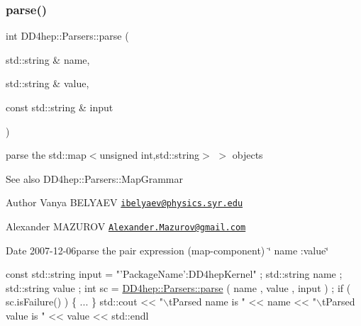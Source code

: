 \subsubsection{\texorpdfstring{parse()}{parse()}\hspace{0.1cm}{\footnotesize\ttfamily [15/21]}}
{\footnotesize\ttfamily int D\+D4hep\+::\+Parsers\+::parse (\begin{DoxyParamCaption}\item[{std\+::string \&}]{name,  }\item[{std\+::string \&}]{value,  }\item[{const std\+::string \&}]{input }\end{DoxyParamCaption})}



parse the {\ttfamily std\+::map$<$unsigned int,std\+::string$>$ $>$} objects 

\begin{DoxySeeAlso}{See also}
D\+D4hep\+::\+Parsers\+::\+Map\+Grammar 
\end{DoxySeeAlso}
\begin{DoxyAuthor}{Author}
Vanya B\+E\+L\+Y\+A\+EV \href{mailto:ibelyaev@physics.syr.edu}{\tt ibelyaev@physics.\+syr.\+edu} 

Alexander M\+A\+Z\+U\+R\+OV \href{mailto:Alexander.Mazurov@gmail.com}{\tt Alexander.\+Mazurov@gmail.\+com} 
\end{DoxyAuthor}
\begin{DoxyDate}{Date}
2007-\/12-\/06parse the pair expression (map-\/component) \char`\"{} \textquotesingle{}name\textquotesingle{} \+:value\char`\"{} 
\begin{DoxyCode}
\textcolor{keyword}{const} std::string input = \textcolor{stringliteral}{"'PackageName':DD4hepKernel"} ;
std::string name  ;
std::string value ;
\textcolor{keywordtype}{int} sc = \hyperlink{namespace_d_d4hep_1_1_parsers_a49cf20eb52b8e48550d6e3f74b94069e}{DD4hep::Parsers::parse} ( name , value , input ) ;
\textcolor{keywordflow}{if} ( sc.isFailure() ) \{ ... \}
std::cout <<  \textcolor{stringliteral}{"\(\backslash\)tParsed name  is "} << name
          <<  \textcolor{stringliteral}{"\(\backslash\)tParsed value is "} << value << std::endl
\end{DoxyCode}

\end{DoxyDate}

